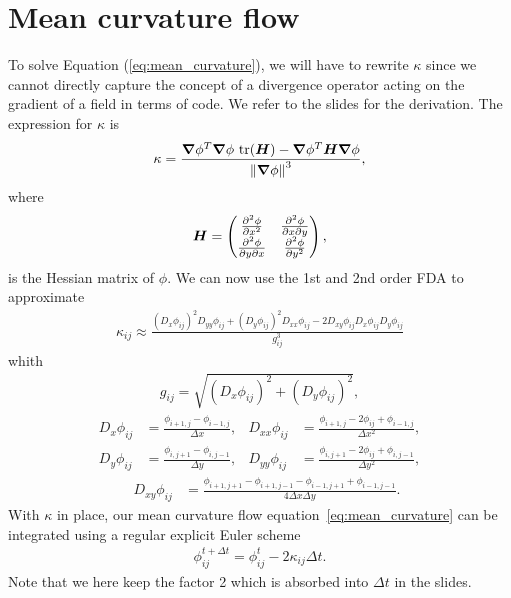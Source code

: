 \documentclass[acmtog]{acmart}
\begin{document}
\section{Mean curvature flow}
To solve Equation (\ref{eq:mean_curvature}), we will have to rewrite $\kappa$
since we cannot directly capture the concept of a divergence operator acting on
the gradient of a field in terms of code. We refer to the slides for the
derivation. The expression for $\kappa$ is
%
\begin{align}
  \kappa = \frac{\boldsymbol \nabla \phi^T \boldsymbol \nabla \phi \, \tr(\boldsymbol H) - \boldsymbol \nabla \phi^T \boldsymbol H \boldsymbol \nabla \phi}{\left\lVert \boldsymbol \nabla \phi \right\rVert^3 },
\end{align}
%
where
%
\begin{align}
  \boldsymbol H = \begin{pmatrix}
                    \pdv[2]{\phi}{x} & \pdv{\phi}{x}{y} \\
                    \pdv{\phi}{y}{x} & \pdv[2]{\phi}{y}
                  \end{pmatrix},
\end{align}
%
is the Hessian matrix of $\phi$. We can now use the 1st and 2nd order FDA to
approximate
%
\begin{align}
  \kappa_{ij} \approx \frac{(D_x\phi_{ij})^2 D_{yy}\phi_{ij} + (D_y\phi_{ij})^2 D_{xx}\phi_{ij} - 2 D_{xy}\phi_{ij} D_x\phi_{ij} D_y\phi_{ij}}{g_{ij}^3} \label{eq:mean_curvature_FDA}
\end{align}
%
whith
%
\begin{align}
  g_{ij} = \sqrt{ (D_x \phi_{ij})^2 + (D_y \phi_{ij})^2 },
\end{align}
%
\begin{align}
  D_x \phi_{ij} & =  \frac{\phi_{i+1, j} - \phi_{i-1, j}}{\Delta x}, & D_{xx} \phi_{ij} & = \frac{\phi_{i+1, j} - 2 \phi_{ij} + \phi_{i-1, j}}{\Delta x^2}, \\
  D_y \phi_{ij} & =  \frac{\phi_{i, j+1} - \phi_{i, j-1}}{\Delta y}, & D_{yy} \phi_{ij} & = \frac{\phi_{i, j+1} - 2 \phi_{ij} + \phi_{i, j-1}}{\Delta y^2},
\end{align}
\begin{align} \quad D_{xy} \phi_{ij} & = \frac{\phi_{i+1, j+1} - \phi_{i+1, j-1} - \phi_{i-1, j+1} + \phi_{i-1, j-1}}{4 \Delta x \Delta y}.
\end{align}
%
With $\kappa$ in place, our mean curvature flow
equation~\ref{eq:mean_curvature} can be integrated using a regular explicit
Euler scheme
%
\begin{align}
  \phi_{ij}^{t+\Delta t} = \phi_{ij}^t - 2 \kappa_{ij} \Delta t. \label{eq:mean_curvature_euler}
\end{align}
%
Note that we here keep the factor 2 which is absorbed into $\Delta t$ in the
slides.
\end{document}
